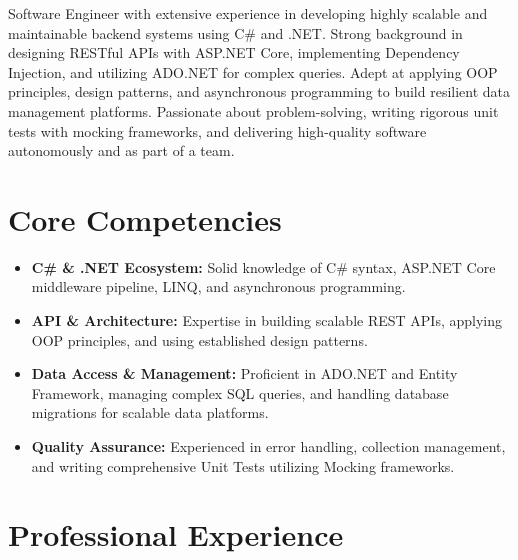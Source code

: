 \documentclass[11pt,a4paper,sans]{moderncv}
\begin{document}
\makecvtitle

\vspace{-15pt}
Software Engineer with extensive experience in developing highly scalable and maintainable backend systems using C\# and .NET. Strong background in designing RESTful APIs with ASP.NET Core, implementing Dependency Injection, and utilizing ADO.NET for complex queries. Adept at applying OOP principles, design patterns, and asynchronous programming to build resilient data management platforms. Passionate about problem-solving, writing rigorous unit tests with mocking frameworks, and delivering high-quality software autonomously and as part of a team.

\section{Core Competencies}
\vspace{1pt}
\begin{itemize}
\item \textbf{C\# \& .NET Ecosystem:} Solid knowledge of C\# syntax, ASP.NET Core middleware pipeline, LINQ, and asynchronous programming.
\item \textbf{API \& Architecture:} Expertise in building scalable REST APIs, applying OOP principles, and using established design patterns.
\item \textbf{Data Access \& Management:} Proficient in ADO.NET and Entity Framework, managing complex SQL queries, and handling database migrations for scalable data platforms.
\item \textbf{Quality Assurance:} Experienced in error handling, collection management, and writing comprehensive Unit Tests utilizing Mocking frameworks.
\end{itemize}

\section{Professional Experience}
\vspace{1pt}
\end{document}
